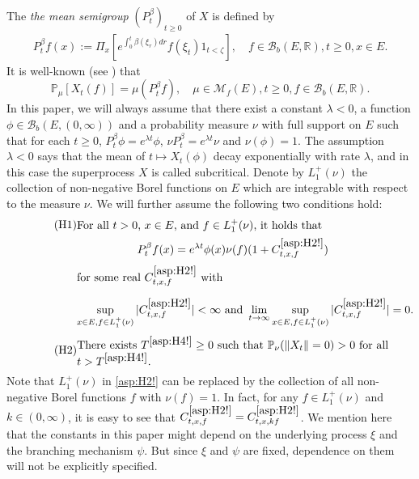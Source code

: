\documentclass[12pt,a4paper]{amsart}
\numberwithin{equation}{section}
\theoremstyle{plain}
\theoremstyle{definition}
\theoremstyle{remark}
\begin{document}
The \emph{the mean semigroup} $(P_t^\beta)_{t\geq 0}$ of $X$ is defined by
\begin{align}
	P_t^\beta f(x)
	:= \Pi_x\left[e^{\int_0^t \beta(\xi_r)dr }f(\xi_t)  1_{t < \zeta}\right],
	\quad f\in \mathcal B_b(E,\mathbb R), t\geq 0, x\in E.
\end{align}
	It is well-known (see \cite[Proposition 2.27]{Li2011MeasureValued}) that
\begin{equation} \label{Fact:M!}
	\mathbb P_\mu[X_t(f)] = \mu (P_t^\beta f),
	\quad \mu \in \mathcal M_f(E), t\geq 0, f \in \mathcal B_b(E,\mathbb R).
\end{equation}	
In this paper, we will always assume that there exist a constant $\lambda<0$,
a function $\phi \in \mathcal B_b(E,(0,\infty))$ and a probability measure $\nu$ with full support on $E$ such that for each $t\geq 0$, $P_t^\beta \phi = e^{\lambda t}\phi$, $\nu P_t^\beta = e^{\lambda t} \nu$ and $\nu(\phi) = 1$.
	The assumption $\lambda<0$ says that the mean of $t\mapsto X_t(\phi)$ decay exponentially with rate $\lambda$, and in this case the superprocess $X$ is called subcritical.
	Denote by $L_1^+(\nu)$ the collection of
	non-negative Borel functions on $E$ which are integrable with respect to the measure $\nu$.
	We will further assume the following two conditions hold:
\begin{align}
\label{asp:H2!} \tag{H1}
&\begin{minipage}{0.8\textwidth}
	For all $t>0$, $x\in E$, and $f\in L_1^+(\nu)$, it holds that
\end{minipage}
\\
&\begin{minipage}{0.8\textwidth}
	\[ P_t^\beta f(x) = e^{\lambda t} \phi(x) \nu(f) (1+ C^{\eqref{asp:H2!}}_{t,x,f})\]
	for some real $C^{\eqref{asp:H2!}}_{t,x,f}$ with
	\[\sup_{x\in E, f\in L_1^+(\nu)} |C^{\eqref{asp:H2!}}_{t,x,f}| < \infty
	\mbox{ and }
	\lim_{t\to \infty} \sup_{x\in E, f\in L_1^+(\nu)} |C^{\eqref{asp:H2!}}_{t,x,f}| = 0.\]
\end{minipage}
\end{align}
\begin{equation}
\label{asp:H4!} \tag{H2}
\begin{minipage}{0.8\textwidth}
	There exists  $T^{\eqref{asp:H4!}}\geq 0$ such that $\mathbb P_\nu(\|X_t\| = 0)>0$ for all $t> T^{\eqref{asp:H4!}}$.
\end{minipage}
\end{equation}
	Note that $L_1^+(\nu)$ in \eqref{asp:H2!} can be replaced by the collection of all non-negative Borel functions $f$ with $\nu(f) = 1$.
	In fact, for any $f\in L_1^+(\nu)$ and $k \in (0,\infty)$, it is easy to see that $C^{\eqref{asp:H2!}}_{t,x,f} = C^{\eqref{asp:H2!}}_{t,x,kf}$.
	We  mention here that the constants in this paper might depend on the underlying process $\xi$ and the branching mechanism $\psi$. But since $\xi$ and $\psi$ are fixed, dependence on them will not be explicitly specified.
\end{document}
